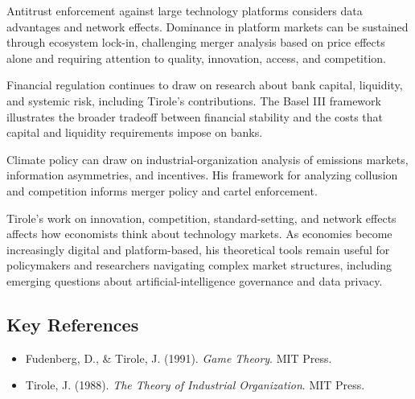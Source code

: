 Antitrust enforcement against large technology platforms considers data
advantages and network effects. Dominance in platform markets can be sustained
through ecosystem lock-in, challenging merger analysis based on price effects
alone and requiring attention to quality, innovation, access, and competition.

Financial regulation continues to draw on research about bank capital, liquidity,
and systemic risk, including Tirole's contributions. The Basel III framework
illustrates the broader tradeoff between financial stability and the costs that
capital and liquidity requirements impose on banks.

Climate policy can draw on industrial-organization analysis of emissions markets,
information asymmetries, and incentives. His framework for analyzing collusion
and competition informs merger policy and cartel enforcement.

Tirole's work on innovation, competition, standard-setting, and network effects
affects how economists think about technology markets. As economies become
increasingly digital and platform-based, his theoretical tools remain useful for
policymakers and researchers navigating complex market structures, including
emerging questions about artificial-intelligence governance and data privacy.

\subsection*{Key References}
\begin{itemize}
    \item Fudenberg, D., \& Tirole, J. (1991). \textit{Game Theory}. MIT Press.
    \item Tirole, J. (1988). \textit{The Theory of Industrial Organization}. MIT Press.
\end{itemize}
